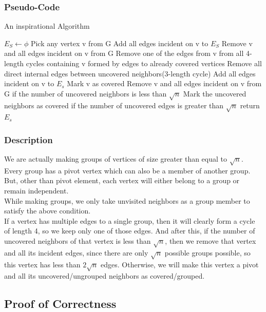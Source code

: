 \documentclass{article}
\begin{document}
\subsubsection{Pseudo-Code}
\begin{algorithm}
\caption{An inspirational Algorithm}
\label{hm}
\begin{algorithmic}[1]
\State $E_S \gets \phi$
  
\State Pick any vertex v from G
\State Add all edges incident on v to $E_S$
\State Remove v and all edges incident on v from G
\Else
\State Remove one of the edges from v from all 4-length cycles containing v formed by edges to already covered vertices
\State Remove all direct internal edges between uncovered neighbors(3-length cycle) 
\State Add all edges incident on v to $E_s$ 
\State Mark v as covered
\State Remove v and all edges incident on v from G if the number of uncovered neighbors is less than $\sqrt{n}$
\State Mark the uncovered neighbors as covered if the number of uncovered edges is greater than $\sqrt{n}$
\EndIf
\EndWhile
\State return $E_s$
\end{algorithmic}
\end{algorithm}
\subsubsection{Description}

We are actually making groups of vertices of size greater than equal to $\sqrt{n}$. Every group has a pivot vertex which can also be a member of another group. But, other than pivot element, each vertex will either belong to a group or remain independent. \\

While making groups, we only take unvisited neighbors as a group member to satisfy the above condition.\\

If a vertex has multiple edges to a single group, then it will clearly form a cycle of length 4, so we keep only one of those edges. And after this, if the number of uncovered neighbors of that vertex is less than $\sqrt{n}$, then we remove that vertex and all its incident edges, since there are only $\sqrt{n}$ possible groups possible, so this vertex has less than $2\sqrt{n}$ edges. Otherwise, we will make this vertex a pivot and all its uncovered/ungrouped neighbors as covered/grouped.

\subsection{Proof of Correctness}
\end{document}
